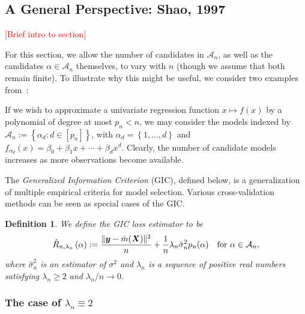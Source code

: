 \documentclass[12pt, letter paper]{article}
\newcommand{\1}{\mathmybb{1}}
\newtheorem{definition}{Definition}[section]
\newcommand{\0}{\emptyset}
\newcommand{\paren}[1]{\left(#1 \right)}
\newcommand{\set}[1]{\left\{ #1 \right\}}
\newcommand{\norm}[1]{|\hspace{-1pt}|#1 |\hspace{-1pt}|}
\newcommand{\normsq}[1]{\norm{#1}^{2}}
\newcommand{\Acal}{\mathcal{A}_{n}}
\newcommand{\Tcal}{\mathcal{T}_{n}}
\newcommand{\X}{\boldsymbol{X}}
\newcommand{\y}{\boldsymbol{y}}
\newcommand{\Rhat}[2]{\hat{R}_{n, #1}\paren{#2}}
\newcommand{\sigmahat}{\hat{\sigma}^{2}_{n}}
\begin{document}
\subsection{A General Perspective: Shao, 1997}
\renewcommand{\Acal}{\mathcal{A}_{n}}
\renewcommand{\Tcal}{\mathcal{T}_{n}}

\textcolor{red}{[Brief intro to section]}


For this section, we allow the number of candidates in \(\Acal\), as well as the candidates \(\alpha\in\Acal\) themselves, to vary with \(n\) (though we assume that both remain finite). To illustrate why this might be useful, we consider two examples from~\textcite{shao_1997}:

If we wish to approximate a univariate regression function \(x\mapsto f(x)\) by a polynomial of degree at most \(p_{n}< n\), we may consider the models indexed by \(\Acal:=\set{\alpha_{d}:d\in[p_n]}\), with \(\alpha_{d} = \set{1,\ldots,d}\) and \(f_{\alpha_{d}}(x) = \beta_{0} + \beta_{1}x + \cdots + \beta_{d}x^{d}\). Clearly, the number of candidate models increases as more observations become available.

The \emph{Generalized Information Criterion} (GIC), defined below, is a generalization of multiple empirical criteria for model selection. Various cross-validation methods can be seen as special cases of the GIC.

\begin{definition}
    We define the GIC loss estimator to be
    \[\Rhat{\lambda_{n}}{\alpha} := \frac{\normsq{\y - \hat{m}(\X)}}{n} + \frac{1}{n}\lambda_{n}\sigmahat p_{n}(\alpha)\quad\text{for }\alpha\in\Acal,\]
    where \(\sigmahat\) is an estimator of \(\sigma^{2}\) and \(\lambda_{n}\) is a sequence of positive real numbers satisfying \(\lambda_{n}\geq 2\) and \(\lambda_{n}/n\to 0\).
\end{definition}

\subsubsection{The case of \(\lambda_{n} \equiv 2\)}
\end{document}
